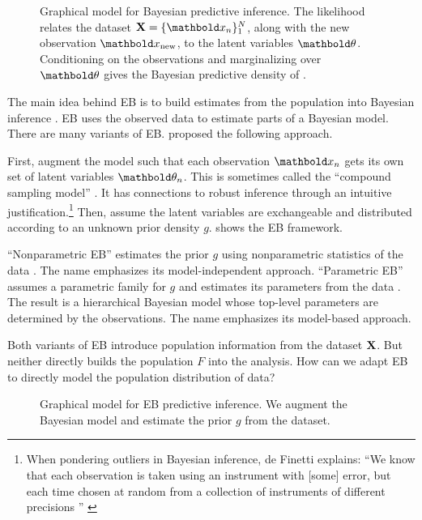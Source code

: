 \begin{figure}[tb]
\centering

\caption{Graphical model for Bayesian predictive inference.
The likelihood relates the dataset $\mbX = \{\mb{x}_n\}_1^N$,
along with the new observation $\xnew$, to the latent variables $\mbtheta$.
Conditioning on the observations and marginalizing over $\mbtheta$ gives the
Bayesian predictive density of .}
\label{fig:bayes_predictive}
\end{figure}

The main idea behind \Gls{EB} is to build estimates from the population into
Bayesian inference \citep{robbins1955empirical,morris1983parametric}.
\gls{EB} uses the observed data to estimate parts of a Bayesian model. There are
many variants of \gls{EB}. \citet{robbins1955empirical} proposed the following
approach.

First, augment the model such that each observation $\mbx_n$ gets
its own set of latent variables $\mbtheta_n$. This is sometimes called the
``compound sampling model'' \citep{berger1985statistical}.
It has connections to robust inference \citep{berger1986robust} through an
intuitive justification.\footnote{When pondering outliers in Bayesian
inference, de Finetti explains: ``We know that
each observation is taken using an instrument with [some] error, but each time
chosen at random from a collection of instruments of different precisions
'' \citep{deFinetti1961bayesian}}
Then, assume the latent variables
are exchangeable and distributed according to an unknown prior density $g$.
 shows the \gls{EB} framework.

``Nonparametric \gls{EB}'' estimates the prior $g$ using nonparametric
statistics of the data \citep{robbins1955empirical,robbins1964empirical}. The
name emphasizes its model-independent approach.  ``Parametric \gls{EB}''
assumes a parametric family for $g$ and estimates its parameters from the data
\citep{morris1983parametric}.
The result is a hierarchical Bayesian model whose top-level
parameters are determined by the observations. The name emphasizes its
 model-based approach.

Both variants of \gls{EB} introduce population information from the
dataset $\textbf{X}$. But neither directly builds the population
$F$ into the analysis. How can we adapt \gls{EB} to directly model the
population distribution of data?


\begin{figure}[tb]
\centering

\caption{Graphical model for \gls{EB} predictive inference. We augment the
Bayesian model and estimate the prior $g$ from the dataset.}
\label{fig:empirical_bayes}
\end{figure}

